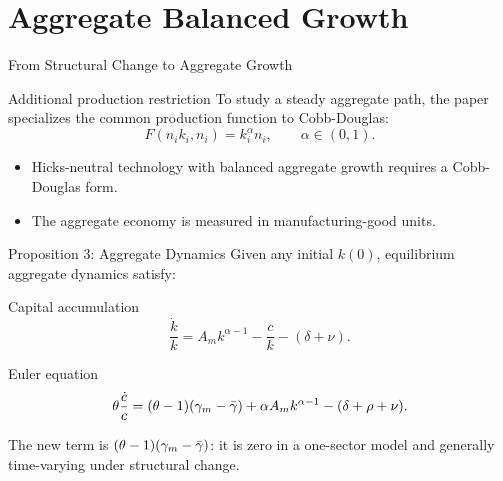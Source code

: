 \section{Aggregate Balanced Growth}

\begin{frame}{From Structural Change to Aggregate Growth}
  \small
  \begin{block}{Additional production restriction}
    To study a steady aggregate path, the paper specializes the common
    production function to Cobb-Douglas:
    \begin{equation*}
      F(n_i k_i,n_i)=k_i^\alpha n_i,\qquad \alpha\in(0,1).
    \end{equation*}
  \end{block}

  \vspace{0.15cm}
  \begin{itemize}
    \item Hicks-neutral technology with balanced aggregate growth requires a
      Cobb-Douglas form.
    \item The aggregate economy is measured in manufacturing-good units.
  \end{itemize}
\end{frame}

\begin{frame}{Proposition 3: Aggregate Dynamics}
  \small
  Given any initial $k(0)$, equilibrium aggregate dynamics satisfy:
  \begin{block}{Capital accumulation}
    \begin{equation*}
      \frac{\dot k}{k}
      =A_m k^{\alpha-1}-\frac{c}{k}-(\delta+\nu).
    \end{equation*}
  \end{block}

  \begin{alertblock}{Euler equation}
    \begin{equation*}
      \theta\frac{\dot c}{c}
      =
      (\theta-1)(\gamma_m-\bar{\gamma})
      +\alpha A_m k^{\alpha-1}-(\delta+\rho+\nu).
    \end{equation*}
  \end{alertblock}

  \vspace{0.10cm}
  The new term is $(\theta-1)(\gamma_m-\bar{\gamma})$: it is zero in a one-sector
  model and generally time-varying under structural change.
\end{frame}

